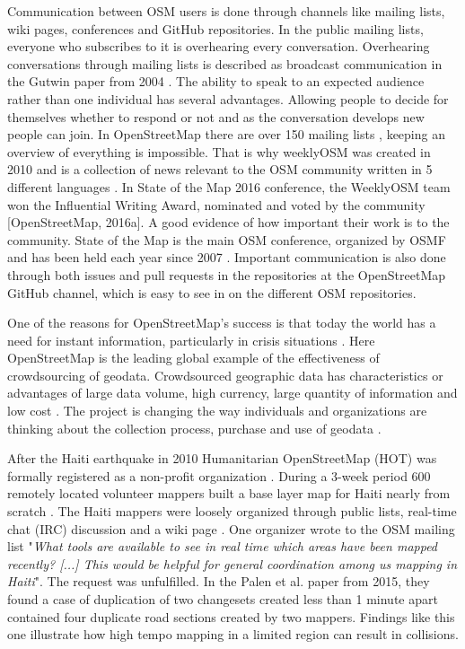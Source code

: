 \documentclass[12pt, a4paper]{report}   	%
\begin{document}
Communication between OSM users is done through channels like mailing lists, wiki pages, conferences and GitHub repositories. In the public mailing lists, everyone who subscribes to it is overhearing every conversation. Overhearing conversations through mailing lists is described as broadcast communication in the Gutwin paper from 2004 \cite{Gutwin2004}. The ability to speak to an expected audience rather than one individual has several advantages. Allowing people to decide for themselves whether to respond or not and as the conversation develops new people can join. In OpenStreetMap there are over 150 mailing lists \cite{Reiter2016}, keeping an overview of everything is impossible. That is why weeklyOSM was created in 2010 and is a collection of news relevant to the OSM community written in 5 different languages \cite{Freyfogle2016}.  In State of the Map 2016 conference, the WeeklyOSM team won the Influential Writing Award, nominated and voted by the community [OpenStreetMap, 2016a]. A good evidence of how important their work is to the community. State of the Map is the main OSM conference, organized by OSMF and has been held each year since 2007 \cite{OpenStreetMapj}. Important communication is also done through both issues and pull requests in the repositories at the OpenStreetMap GitHub channel, which is easy to see in on the different OSM repositories. 

One of the reasons for OpenStreetMap's success is that today the world has a need for instant information, particularly in crisis situations \cite{Chilton}. Here OpenStreetMap is the leading global example of the effectiveness of crowdsourcing of geodata. Crowdsourced geographic data has characteristics or advantages of large data volume, high currency, large quantity of information and low cost \cite{Wang2013}. The project is changing the way individuals and organizations are thinking about the collection process, purchase and use of geodata \cite{Chilton}.  

After the Haiti earthquake in 2010 Humanitarian OpenStreetMap (HOT) was formally registered as a non-profit organization \cite{Soden}. During a 3-week period 600 remotely located volunteer mappers built a base layer map for Haiti nearly from scratch \cite{Soden}. The Haiti mappers were loosely organized through public lists, real-time chat (IRC) discussion and a wiki page \cite{Palen2015}. One organizer wrote to the OSM mailing list "\textit{What tools are available to see in real time which areas have been mapped recently? [...] This would be helpful for general coordination among us mapping in Haiti}". The request was unfulfilled. In the Palen et al. paper from 2015, they found a case of duplication of two changesets created less than 1 minute apart contained four duplicate road sections created by two mappers. Findings like this one illustrate how high tempo mapping in a limited region can result in collisions. 
\end{document}
